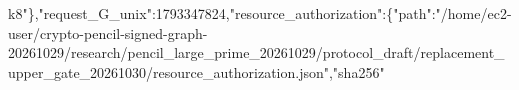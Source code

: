 \documentclass[10pt]{article}
\begin{document}
k{}8\allowbreak{}"\allowbreak{}\}\allowbreak{},\allowbreak{}"\allowbreak{}r\allowbreak{}e\allowbreak{}q\allowbreak{}u\allowbreak{}e\allowbreak{}s\allowbreak{}t\allowbreak{}\_\allowbreak{}G\allowbreak{}\_\allowbreak{}u\allowbreak{}n\allowbreak{}i\allowbreak{}x\allowbreak{}"\allowbreak{}:\allowbreak{}1\allowbreak{}7\allowbreak{}9\allowbreak{}3\allowbreak{}3\allowbreak{}4\allowbreak{}7\allowbreak{}8\allowbreak{}2\allowbreak{}4\allowbreak{},\allowbreak{}"\allowbreak{}r\allowbreak{}e\allowbreak{}s\allowbreak{}o\allowbreak{}u\allowbreak{}r\allowbreak{}c\allowbreak{}e\allowbreak{}\_\allowbreak{}a\allowbreak{}u\allowbreak{}t\allowbreak{}h\allowbreak{}o\allowbreak{}r\allowbreak{}i\allowbreak{}z\allowbreak{}a\allowbreak{}t\allowbreak{}i\allowbreak{}o\allowbreak{}n\allowbreak{}"\allowbreak{}:\allowbreak{}\{\allowbreak{}"\allowbreak{}p\allowbreak{}a\allowbreak{}t\allowbreak{}h\allowbreak{}"\allowbreak{}:\allowbreak{}"\allowbreak{}/\allowbreak{}h\allowbreak{}o\allowbreak{}m\allowbreak{}e\allowbreak{}/\allowbreak{}e\allowbreak{}c\allowbreak{}2\allowbreak{}-\allowbreak{}u\allowbreak{}s\allowbreak{}e\allowbreak{}r\allowbreak{}/\allowbreak{}c\allowbreak{}r\allowbreak{}y\allowbreak{}p\allowbreak{}t\allowbreak{}o\allowbreak{}-\allowbreak{}p\allowbreak{}e\allowbreak{}n\allowbreak{}c\allowbreak{}i\allowbreak{}l\allowbreak{}-\allowbreak{}s\allowbreak{}i\allowbreak{}g\allowbreak{}n\allowbreak{}e\allowbreak{}d\allowbreak{}-\allowbreak{}g\allowbreak{}r\allowbreak{}a\allowbreak{}p\allowbreak{}h\allowbreak{}-\allowbreak{}2\allowbreak{}0\allowbreak{}2\allowbreak{}6\allowbreak{}1\allowbreak{}0\allowbreak{}2\allowbreak{}9\allowbreak{}/\allowbreak{}r\allowbreak{}e\allowbreak{}s\allowbreak{}e\allowbreak{}a\allowbreak{}r\allowbreak{}c\allowbreak{}h\allowbreak{}/\allowbreak{}p\allowbreak{}e\allowbreak{}n\allowbreak{}c\allowbreak{}i\allowbreak{}l\allowbreak{}\_\allowbreak{}l\allowbreak{}a\allowbreak{}r\allowbreak{}g\allowbreak{}e\allowbreak{}\_\allowbreak{}p\allowbreak{}r\allowbreak{}i\allowbreak{}m\allowbreak{}e\allowbreak{}\_\allowbreak{}2\allowbreak{}0\allowbreak{}2\allowbreak{}6\allowbreak{}1\allowbreak{}0\allowbreak{}2\allowbreak{}9\allowbreak{}/\allowbreak{}p\allowbreak{}r\allowbreak{}o\allowbreak{}t\allowbreak{}o\allowbreak{}c\allowbreak{}o\allowbreak{}l\allowbreak{}\_\allowbreak{}d\allowbreak{}r\allowbreak{}a\allowbreak{}f\allowbreak{}t\allowbreak{}/\allowbreak{}r\allowbreak{}e\allowbreak{}p\allowbreak{}l\allowbreak{}a\allowbreak{}c\allowbreak{}e\allowbreak{}m\allowbreak{}e\allowbreak{}n\allowbreak{}t\allowbreak{}\_\allowbreak{}u\allowbreak{}p\allowbreak{}p\allowbreak{}e\allowbreak{}r\allowbreak{}\_\allowbreak{}g\allowbreak{}a\allowbreak{}t\allowbreak{}e\allowbreak{}\_\allowbreak{}2\allowbreak{}0\allowbreak{}2\allowbreak{}6\allowbreak{}1\allowbreak{}0\allowbreak{}3\allowbreak{}0\allowbreak{}/\allowbreak{}r\allowbreak{}e\allowbreak{}s\allowbreak{}o\allowbreak{}u\allowbreak{}r\allowbreak{}c\allowbreak{}e\allowbreak{}\_\allowbreak{}a\allowbreak{}u\allowbreak{}t\allowbreak{}h\allowbreak{}o\allowbreak{}r\allowbreak{}i\allowbreak{}z\allowbreak{}a\allowbreak{}t\allowbreak{}i\allowbreak{}o\allowbreak{}n\allowbreak{}.\allowbreak{}j\allowbreak{}s\allowbreak{}o\allowbreak{}n\allowbreak{}"\allowbreak{},\allowbreak{}"\allowbreak{}s\allowbreak{}h\allowbreak{}a\allowbreak{}2\allowbreak{}5\allowbreak{}6\allowbreak{}"\
\end{document}
